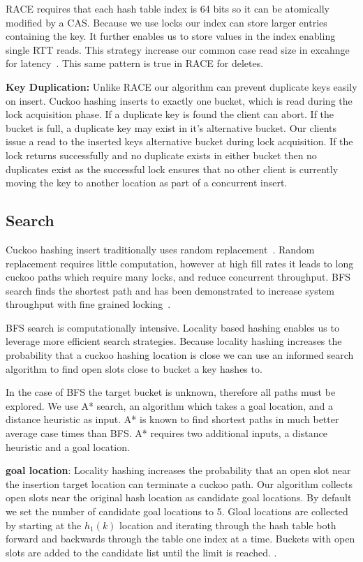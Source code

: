RACE requires that each hash table index is 64 bits so it
can be atomically modified by a CAS. Because we use locks
our index can store larger entries containing the key. It
further enables us to store values in the index enabling
single RTT reads. This strategy increase our common case
read size in excahnge for latency~.
This same pattern is true in RACE for deletes. 

\textbf{Key Duplication:} Unlike RACE our algorithm can
prevent duplicate keys easily on insert. Cuckoo hashing
inserts to exactly one bucket, which is read during the lock
acquisition phase. If a duplicate key is found the client
can abort. If the bucket is full, a duplicate key may exist
in it's alternative bucket. Our clients issue a read to the
inserted keys alternative bucket during lock acquisition. If
the lock returns successfully and no duplicate exists in
either bucket then no duplicates exist as the successful
lock ensures that no other client is currently moving the
key to another location as part of a concurrent insert.

\subsection{Search}
Cuckoo hashing insert traditionally uses random
replacement~\cite{cuckoo}. Random replacement requires
little computation, however at high fill rates it leads to
long cuckoo paths which require many locks, and reduce
concurrent throughput. BFS search finds the shortest path
and has been demonstrated to increase system throughput with
fine grained locking~\cite{algorithmic-improvements}.

BFS search is computationally intensive. Locality based
hashing enables us to leverage more efficient search
strategies. Because locality hashing increases the
probability that a cuckoo hashing location is close we can
use an informed search algorithm to find open slots close to
bucket a key hashes to. 

In the case of BFS the target bucket is unknown, therefore
all paths must be explored. We use A* search, an algorithm
which takes a goal location, and a distance heuristic as
input. A* is known to find shortest paths in much better
average case times than BFS. A* requires two additional
inputs, a distance heuristic and a goal location.

\textbf{goal location}: Locality hashing increases the
probability that an open slot near the insertion target
location can terminate a cuckoo path. Our algorithm collects
open slots near the original hash location as candidate goal
locations. By default we set the number of candidate goal
locations to 5. Gloal locations are collected by starting at
the $h_1(k)$ location and iterating through the hash
table both forward and backwards through the table one index
at a time. Buckets with open slots are added to the
candidate list until the limit is reached. .

